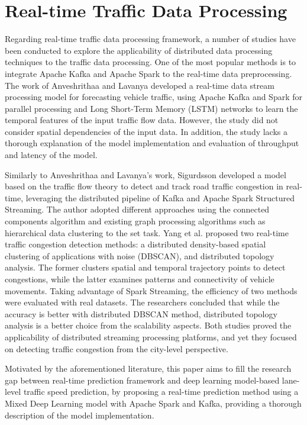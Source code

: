\documentclass[11pt]{uonthesis}
\begin{document}
\section{Real-time Traffic Data Processing}

Regarding real-time traffic data processing framework, a number of studies have been conducted to explore the applicability of distributed data processing techniques to the traffic data processing. One of the most popular methods is to integrate Apache Kafka and Apache Spark to the real-time data preprocessing. The work of Anveshrithaa and Lavanya \cite{9077707} developed a real-time data stream processing model for forecasting vehicle traffic, using Apache Kafka and Spark for parallel processing and Long Short-Term Memory (LSTM) networks to learn the temporal features of the input traffic flow data. However, the study did not consider spatial dependencies of the input data. In addition, the study lacks a thorough explanation of the model implementation and evaluation of throughput and latency of the model.

Similarly to Anveshrithaa and Lavanya's work, Sigurdsson \cite{Sigurdsson2018RoadTC} developed a model based on the traffic flow theory to detect and track road traffic congestion in real-time, leveraging the distributed pipeline of Kafka and Apache Spark Structured Streaming. The author adopted different approaches using the connected components algorithm and existing graph processing algorithms such as hierarchical data clustering to the set task. Yang et al. \cite{Yang2019} proposed two real-time traffic congestion detection methods: a distributed density-based spatial clustering of applications with noise (DBSCAN), and distributed topology analysis. The former clusters spatial and temporal trajectory points to detect congestions, while the latter examines patterns and connectivity of vehicle movements. Taking advantage of Spark Streaming, the efficiency of two methods were evaluated with real datasets. The researchers concluded that while the accuracy is better with distributed DBSCAN method, distributed topology analysis is a better choice from the scalability aspects. Both studies proved the applicability of distributed streaming processing platforms, and yet they focused on detecting traffic congestion from the city-level perspective.

Motivated by the aforementioned literature, this paper aims to fill the research gap between real-time prediction framework and deep learning model-based lane-level traffic speed prediction, by proposing a real-time prediction method using a Mixed Deep Learning model with Apache Spark and Kafka, providing a thorough description of the model implementation. %
\end{document}
